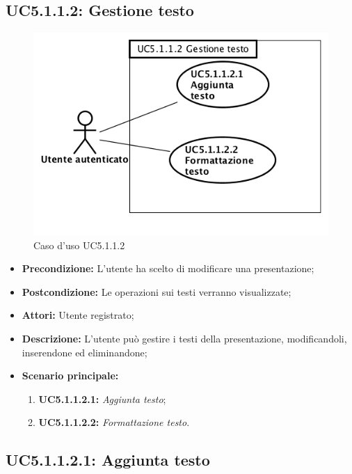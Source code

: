 \newpage
\subsection{ UC5.1.1.2: Gestione testo}

\begin{figure}[h]
	\begin{center}
	\includegraphics[scale=0.6]{diagram/UC5-1-1-2.png}
	\caption{Caso d'uso UC5.1.1.2}
	\end{center}
\end{figure}
\begin{itemize}
	\item \textbf{Precondizione:} L'utente ha scelto di modificare una presentazione;
	\item \textbf{Postcondizione:} Le operazioni sui testi verranno visualizzate;
	\item \textbf{Attori:} Utente registrato;
	\item \textbf{Descrizione:} L'utente può gestire i testi della presentazione, modificandoli, inserendone ed eliminandone;
	\item \textbf{Scenario principale:}
	\begin{enumerate}
		\item \textbf{ UC5.1.1.2.1:} \textit{ Aggiunta testo};
		\item \textbf{ UC5.1.1.2.2:} \textit{ Formattazione testo}.
	\end{enumerate}
\end{itemize}
\subsection{ UC5.1.1.2.1: Aggiunta testo}

